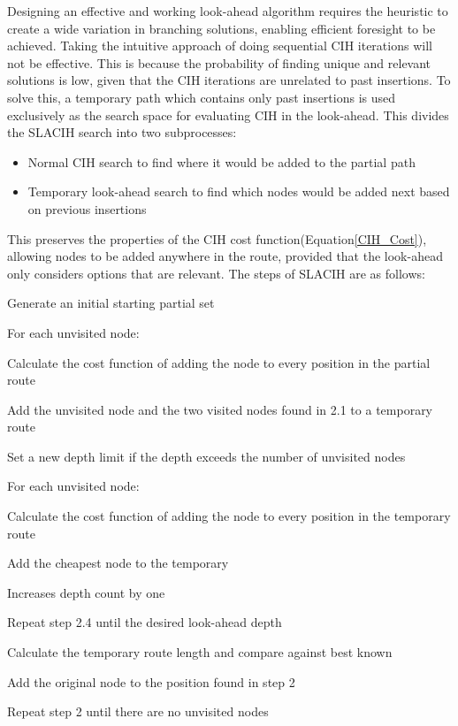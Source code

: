 Designing an effective and working look-ahead algorithm requires the heuristic to create a wide variation in branching solutions, enabling efficient foresight to be achieved. Taking the intuitive approach of doing sequential CIH iterations will not be effective. This is because the probability of finding unique and relevant solutions is low, given that the CIH iterations are unrelated to past insertions. To solve this, a temporary path which contains only past insertions is used exclusively as the search space for evaluating CIH in the look-ahead. This divides the SLACIH search into two subprocesses:

\begin{itemize}
    \item Normal CIH search to find where it would be added to the partial path
    \item Temporary look-ahead search to find which nodes would be added next based on previous insertions
\end{itemize}

This preserves the properties of the CIH cost function(Equation\ref{CIH_Cost}), allowing nodes to be added anywhere in the route, provided that the look-ahead only considers options that are relevant. The steps of SLACIH are as follows:

\begin{legal}
    \item Generate an initial starting partial set \label{LAI_Init}
    \item For each unvisited node:  \label{LAI_For1}
    \begin{legal}
            \item Calculate the cost function of adding the node to every position in the partial route \label{LAI_CIH}
            \item Add the unvisited node and the two visited nodes found in 2.1 to a temporary route \label{LAI_CIH2}
            \item Set a new depth limit if the depth exceeds the number of unvisited nodes \label{LAI_CIH3}
            \item For each unvisited node:\label{LAI_For2}
            \begin{legal}
                \item Calculate the cost function of adding the node to every position in the temporary route\label{LAI}
                \item Add the cheapest node to the temporary\label{LAI2}
                \item Increases depth count by one \label{LAI3}
                \item Repeat step 2.4 until the desired look-ahead depth \label{LAI4}
            \end{legal}
    \end{legal}
    \item Calculate the temporary route length and compare against best known \label{LAI_Calc}
    \item Add the original node to the position found in step 2 \label{LAI_ADD}
    \item Repeat step 2 until there are no unvisited nodes \label{LAI_While}
\end{legal}

